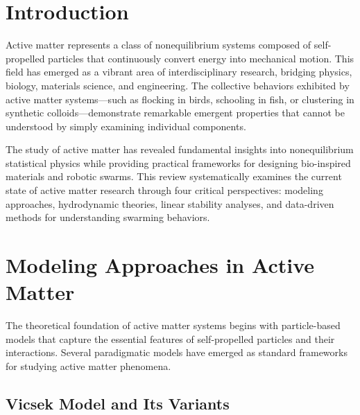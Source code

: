 \documentclass[a4paper, amsfonts, amssymb, amsmath, reprint, showkeys, showpacs, nofootinbib, twoside]{revtex4-2}
\begin{document}
\section{\label{sec:introduction}Introduction}

Active matter represents a class of nonequilibrium systems composed of self-propelled particles that continuously convert energy into mechanical motion. This field has emerged as a vibrant area of interdisciplinary research, bridging physics, biology, materials science, and engineering. The collective behaviors exhibited by active matter systems—such as flocking in birds, schooling in fish, or clustering in synthetic colloids—demonstrate remarkable emergent properties that cannot be understood by simply examining individual components.

The study of active matter has revealed fundamental insights into nonequilibrium statistical physics while providing practical frameworks for designing bio-inspired materials and robotic swarms. This review systematically examines the current state of active matter research through four critical perspectives: modeling approaches, hydrodynamic theories, linear stability analyses, and data-driven methods for understanding swarming behaviors.


\section{\label{sec:models}Modeling Approaches in Active Matter}

The theoretical foundation of active matter systems begins with particle-based models that capture the essential features of self-propelled particles and their interactions. Several paradigmatic models have emerged as standard frameworks for studying active matter phenomena.

\subsection{Vicsek Model and Its Variants}
\end{document}
